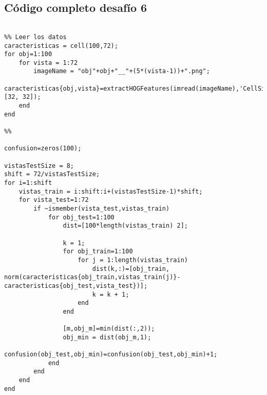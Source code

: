 \documentclass[es,gi]{ifirak}\usepackage[]{graphicx}\usepackage[]{color}
\begin{document}
\subsection{Código completo desafío 6}
\begin{lstlisting}

%% Leer los datos
caracteristicas = cell(100,72);
for obj=1:100
    for vista = 1:72
        imageName = "obj"+obj+"__"+(5*(vista-1))+".png";
        caracteristicas{obj,vista}=extractHOGFeatures(imread(imageName),'CellSize',[32, 32]);
    end
end

%%

confusion=zeros(100);

vistasTestSize = 8;
shift = 72/vistasTestSize;
for i=1:shift
    vistas_train = i:shift:i+(vistasTestSize-1)*shift;
    for vista_test=1:72
        if ~ismember(vista_test,vistas_train)
            for obj_test=1:100
                dist=[100*length(vistas_train) 2];
                
                k = 1;
                for obj_train=1:100
                    for j = 1:length(vistas_train)
                        dist(k,:)=[obj_train, norm(caracteristicas{obj_train,vistas_train(j)}-caracteristicas{obj_test,vista_test})];
                        k = k + 1;
                    end
                end

                [m,obj_m]=min(dist(:,2));
                obj_min = dist(obj_m,1);
                confusion(obj_test,obj_min)=confusion(obj_test,obj_min)+1;
            end
        end
    end
end

\end{lstlisting}
\pagebreak
\end{document}
